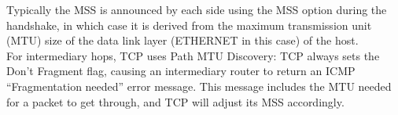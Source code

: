 Typically the MSS is announced by each side using the MSS option during the handshake,
in which case it is derived from the maximum transmission unit (MTU) size of the data
link layer (ETHERNET in this case) of the host. \\
For intermediary hops, TCP uses Path MTU Discovery:
TCP always sets the Don't Fragment flag, causing an intermediary router to return an ICMP
``Fragmentation needed'' error message. This message includes the MTU needed for a packet
to get through, and TCP will adjust its MSS accordingly.
